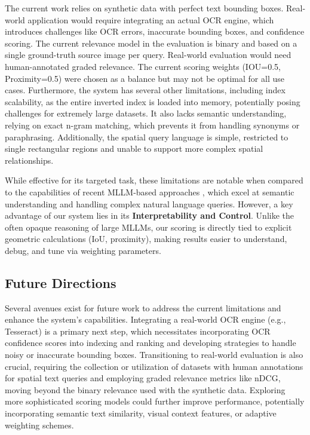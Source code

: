\documentclass[manuscript,screen]{acmart}
\begin{document}
The current work relies on synthetic data with perfect text bounding boxes. Real-world application would require integrating an actual OCR engine, which introduces challenges like OCR errors, inaccurate bounding boxes, and confidence scoring. The current relevance model in the evaluation is binary and based on a single ground-truth source image per query. Real-world evaluation would need human-annotated graded relevance. The current scoring weights (IOU=0.5, Proximity=0.5) were chosen as a balance but may not be optimal for all use cases. Furthermore, the system has several other limitations, including index scalability, as the entire inverted index is loaded into memory, potentially posing challenges for extremely large datasets. It also lacks semantic understanding, relying on exact n-gram matching, which prevents it from handling synonyms or paraphrasing. Additionally, the spatial query language is simple, restricted to single rectangular regions and unable to support more complex spatial relationships.

While effective for its targeted task, these limitations are notable when compared to the capabilities of recent MLLM-based approaches \cite{Huang24, Yin24}, which excel at semantic understanding and handling complex natural language queries. However, a key advantage of our system lies in its \textbf{Interpretability and Control}. Unlike the often opaque reasoning of large MLLMs, our scoring is directly tied to explicit geometric calculations (IoU, proximity), making results easier to understand, debug, and tune via weighting parameters.

\subsection{Future Directions}

Several avenues exist for future work to address the current limitations and enhance the system's capabilities. Integrating a real-world OCR engine (e.g., Tesseract) is a primary next step, which necessitates incorporating OCR confidence scores into indexing and ranking and developing strategies to handle noisy or inaccurate bounding boxes. Transitioning to real-world evaluation is also crucial, requiring the collection or utilization of datasets with human annotations for spatial text queries and employing graded relevance metrics like nDCG, moving beyond the binary relevance used with the synthetic data. Exploring more sophisticated scoring models could further improve performance, potentially incorporating semantic text similarity, visual context features, or adaptive weighting schemes.
\end{document}
